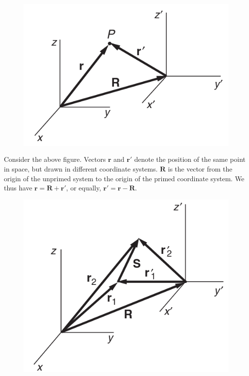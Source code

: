 \documentclass[12pt,twoside]{article}
\begin{document}
\begin{flushleft}
\begin{figure}[H]
\includegraphics[scale=.4]{images/chapter1/image3.png}
\centering
\end{figure}

Consider the above figure. Vectors $\mathbf{r}$ and $\mathbf{r}'$ denote the position of the same point in space, but drawn in different coordinate systems.
$\mathbf{R}$ is the vector from the origin of the unprimed system to the origin of the primed coordinate system. We thus have
$\mathbf{r} = \mathbf{R} + \mathbf{r}'$, or equally, $\mathbf{r}' = \mathbf{r} - \mathbf{R}$.

\begin{figure}[H]
\includegraphics[scale=.4]{images/chapter1/image4.png}
\centering
\end{figure}


\end{flushleft}
\end{document}
